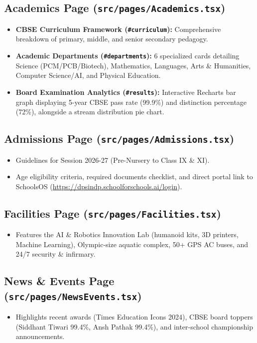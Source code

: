\documentclass[11pt,a4paper]{article}
\begin{document}
\subsection{Academics Page (\texttt{src/pages/Academics.tsx})}
\begin{itemize}
    \item \textbf{CBSE Curriculum Framework (\texttt{\#curriculum}):} Comprehensive breakdown of primary, middle, and senior secondary pedagogy.
    \item \textbf{Academic Departments (\texttt{\#departments}):} 6 specialized cards detailing Science (PCM/PCB/Biotech), Mathematics, Languages, Arts \& Humanities, Computer Science/AI, and Physical Education.
    \item \textbf{Board Examination Analytics (\texttt{\#results}):} Interactive Recharts bar graph displaying 5-year CBSE pass rate (99.9\%) and distinction percentage (72\%), alongside a stream distribution pie chart.
\end{itemize}

\subsection{Admissions Page (\texttt{src/pages/Admissions.tsx})}
\begin{itemize}
    \item Guidelines for Session 2026-27 (Pre-Nursery to Class IX \& XI).
    \item Age eligibility criteria, required documents checklist, and direct portal link to SchoolsOS (\url{https://dpsindp.schoolforschools.ai/login}).
\end{itemize}

\subsection{Facilities Page (\texttt{src/pages/Facilities.tsx})}
\begin{itemize}
    \item Features the AI \& Robotics Innovation Lab (humanoid kits, 3D printers, Machine Learning), Olympic-size aquatic complex, 50+ GPS AC buses, and 24/7 security & infirmary.
\end{itemize}

\subsection{News \& Events Page (\texttt{src/pages/NewsEvents.tsx})}
\begin{itemize}
    \item Highlights recent awards (Times Education Icons 2024), CBSE board toppers (Siddhant Tiwari 99.4\%, Ansh Pathak 99.4\%), and inter-school championship announcements.
\end{itemize}
\end{document}
